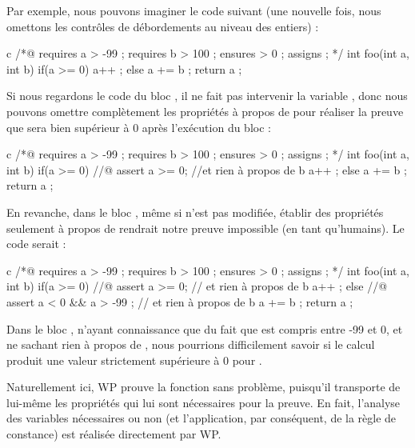 Par exemple, nous pouvons imaginer le code suivant (une nouvelle fois, nous
omettons les contrôles de débordements au niveau des entiers) :



\begin{CodeBlock}{c}
/*@
  requires a > -99 ;
  requires b > 100 ;
  ensures  \result > 0 ;
  assigns  \nothing ;
*/
int foo(int a, int b){
  if(a >= 0){
    a++ ;
  } else {
    a += b ;
  }
  return a ;
}
\end{CodeBlock}



Si nous regardons le code du bloc , il ne fait pas intervenir la
variable , donc nous pouvons omettre complètement les propriétés
à propos de   pour réaliser la preuve que  sera bien
supérieur à 0 après l'exécution du bloc :



\begin{CodeBlock}{c}
/*@
  requires a > -99 ;
  requires b > 100 ;
  ensures  \result > 0 ;
  assigns  \nothing ;
*/
int foo(int a, int b){
  if(a >= 0){
    //@ assert a >= 0; //et rien à propos de b
    a++ ;
  } else {
    a += b ;
  }
  return a ;
}
\end{CodeBlock}



En revanche, dans le bloc , même si  n'est pas
modifiée, établir des propriétés seulement à propos de  rendrait
notre preuve impossible (en tant qu'humains). Le code serait :



\begin{CodeBlock}{c}
/*@
  requires a > -99 ;
  requires b > 100 ;
  ensures  \result > 0 ;
  assigns  \nothing ;
*/
int foo(int a, int b){
  if(a >= 0){
    //@ assert a >= 0; // et rien à propos de b
    a++ ;
  } else {
    //@ assert a < 0 && a > -99 ; // et rien à propos de b
    a += b ;
  }
  return a ;
}
\end{CodeBlock}



Dans le bloc , n'ayant connaissance que du fait que  est compris
entre -99 et 0, et ne sachant rien à propos de , nous pourrions
difficilement savoir si le calcul  produit une valeur
strictement supérieure à 0 pour .



Naturellement ici, WP prouve la fonction sans problème, puisqu'il transporte
de lui-même les propriétés qui lui sont nécessaires pour la preuve. En fait,
l'analyse des variables nécessaires ou non (et l'application, par
conséquent, de la règle de constance) est réalisée directement par WP.



